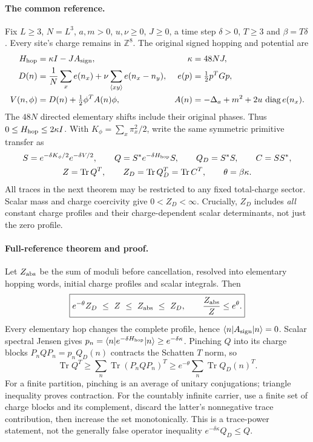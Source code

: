\paragraph{The common reference.}
Fix $L\ge3$, $N=L^3$, $a,m>0$, $u,\nu\ge0$, $J\ge0$, a time step
$\delta>0$, $T\ge3$ and $\beta=T\delta$. Every site's charge remains
in $\mathbb Z^8$. The original signed hopping and potential are
\[
 \begin{aligned}
 H_{\rm hop}&=\kappa I-JA_{\rm sign},&\quad \kappa&=48NJ,\\
 D(n)&=\frac1N\sum_x e(n_x)+\nu\sum_{\langle xy\rangle}e(n_x-n_y),
 &e(p)&=\tfrac12p^TGp,\\
 V(n,\phi)&=D(n)+\tfrac12\phi^T A(n)\phi,
 &A(n)&=-\Delta_a+m^2+2u\,\operatorname{diag}e(n_x).
 \end{aligned}
\]
The $48N$ directed elementary shifts include their original phases.
Thus $0\le H_{\rm hop}\le2\kappa I$. With $K_\phi=\sum_x\pi_x^2/2$,
write the same symmetric primitive transfer as
\[
 \begin{gathered}
 S=e^{-\delta K_\phi/2}e^{-\delta V/2},\qquad
 Q=S^*e^{-\delta H_{\rm hop}}S,\qquad Q_D=S^*S,\qquad C=SS^*,\\
 Z=\operatorname{Tr}Q^T,\qquad
 Z_D=\operatorname{Tr}Q_D^T=\operatorname{Tr}C^T,\qquad
 \theta=\beta\kappa.
 \end{gathered}
\]
All traces in the next theorem may be restricted to any fixed total-charge
sector. Scalar mass and charge coercivity give $0<Z_D<\infty$.
Crucially, $Z_D$ includes \emph{all} constant charge profiles and their
charge-dependent scalar determinants, not just the zero profile.

\paragraph{Full-reference theorem and proof.}
Let $Z_{\rm abs}$ be the sum of moduli before cancellation, resolved into
elementary hopping words, initial charge profiles and scalar integrals.
Then
\begin{equation}
 \boxed{e^{-\theta}Z_D\ \le\ Z\ \le\ Z_{\rm abs}\ \le\ Z_D,
 \qquad \frac{Z_{\rm abs}}{Z}\le e^{\theta}.}
 \label{eq:r27-reference}
\end{equation}
Every elementary hop changes the complete profile, hence
$\langle n|A_{\rm sign}|n\rangle=0$. Scalar spectral Jensen gives
$p_n=\langle n|e^{-\delta H_{\rm hop}}|n\rangle\ge e^{-\delta\kappa}$.
Pinching $Q$ into its charge blocks $P_nQP_n=p_nQ_D(n)$ contracts the
Schatten $T$ norm, so
\[
 \operatorname{Tr}Q^T\ge\sum_n\operatorname{Tr}(P_nQP_n)^T
 \ge e^{-\theta}\sum_n\operatorname{Tr}Q_D(n)^T.
\]
For a finite partition, pinching is an average of unitary conjugations;
triangle inequality proves contraction. For the countably infinite carrier,
use a finite set of charge blocks and its complement, discard the latter's
nonnegative trace contribution, then increase the set monotonically.
This is a trace-power statement, not the generally false operator
inequality $e^{-\delta\kappa}Q_D\le Q$.

